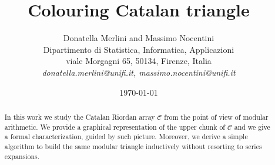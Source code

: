 \documentclass[11pt,a4paper]{article} %
\begin{document}

    \title{Colouring Catalan triangle}
    \author{Donatella Merlini and Massimo Nocentini\\
        Dipartimento di Statistica, Informatica, Applicazioni \\ 
        viale Morgagni 65, 50134, Firenze, Italia \\ 
        {\sl donatella.merlini@unifi.it, massimo.nocentini@unifi.it}}

    \date{\today} 
    
    \maketitle
    
    \begin{abstract}
        In this work we study the Catalan Riordan array $\mathcal{C}$ from the
        point of view of modular arithmetic. We provide a graphical
        representation of the upper chunk of $\mathcal{C}$ and we give
        a formal characterization, guided by such picture. Moreover, 
        we derive a simple algorithm to build the same modular triangle
        inductively without resorting to series expansions.
    \end{abstract}
       

    
    
    
    
    

    \newpage
    
    

\end{document}
